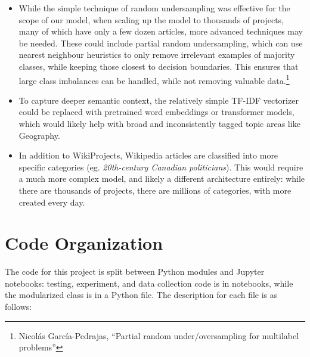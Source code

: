 \documentclass{article}
\newcommand*{\code}[1]{\texttt{\detokenize{#1}}}
\begin{document}
\begin{itemize}
	\item While the simple technique of random undersampling was effective for the scope of
	our model, when scaling up the model to thousands of projects, many of which have only
	a few dozen articles, more advanced techniques may be needed. These could include partial
	random undersampling, which can use nearest neighbour heuristics to only remove irrelevant
	examples of majority classes, while keeping those closest to decision boundaries. This
	ensures that large class imbalances can be handled, while not removing valuable data.\footnote
	{Nicolás García-Pedrajas, ``Partial random under/oversampling for multilabel problems''}
	\item To capture deeper semantic context, the relatively simple TF-IDF vectorizer could be
	replaced with pretrained word embeddings or transformer models, which would likely help
	with broad and inconsistently tagged topic areas like Geography.
	\item In addition to WikiProjects, Wikipedia articles are classified into more specific
	categories (eg. \textit{20th-century Canadian politicians}). This would require a much more
	complex model, and likely a different architecture entirely: while there are thousands
	of projects, there are millions of categories, with more created every day.
\end{itemize}

\section{Code Organization}

The code for this project is split between Python modules and Jupyter notebooks: testing,
experiment, and data collection code is in notebooks, while the modularized \code{Model}
class is in a Python file. The description for each file is as follows:
\end{document}
